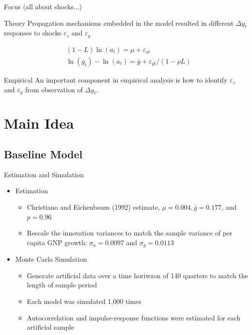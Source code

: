 \documentclass[10pt]{beamer}
\begin{document}
\begin{frame}{Focus (all about shocks...)}
        \begin{exampleblock}{Theory}
            Propagation mechanisms embedded in the model resulted in different $\Delta y_t$ responses to shocks $\varepsilon_z$ and $\varepsilon_g$ 
        \end{exampleblock}
        \begin{align}
            &(1-L) \ln \left(a_{t}\right)=\mu+\varepsilon_{\mathrm{a} t} \\
            &\ln \left(g_{t}\right)-\ln \left(a_{t}\right)=\bar{g}+\varepsilon_{g t} /(1-\rho L) 
        \end{align}
     
        \begin{exampleblock}{Empirical}
        An important component in empirical analysis is how to identify $\varepsilon_z$ and $\varepsilon_g$ from observation of $\Delta y_t$.
    \end{exampleblock}
\end{frame}


\section{Main Idea}
\subsection{Baseline Model}

\begin{frame}{Estimation and Simulation}
    \begin{itemize}
        \item Estimation
            \begin{itemize}
                \item Christiano and Eichenbaum (1992) estimate, $\mu = 0.004, \bar{g} = 0.177$, and $p = 0.96$
                \item Rescale the innovation variances to match the sample variance of per capita GNP growth: $\sigma_a = 0.0097$ and $\sigma_g = 0.0113$
            \end{itemize}
        \item Monte Carlo Simulation
            \begin{itemize}
                \item Generate artificial data over a time horiwzon of 140 quarters to match the length of sample period
                \item Each model was simulated 1,000 times
                \item Autocorrelation and impulse-response functions were estimated for each artificial sample
            \end{itemize}
        
    \end{itemize}
\end{frame}
\end{document}

